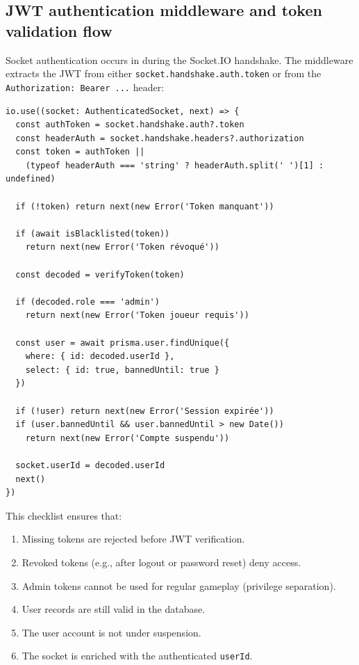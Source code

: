 \documentclass[11pt,a4paper]{article}
\begin{document}
\subsection{JWT authentication middleware and token validation flow}

Socket authentication occurs in  during the Socket.IO handshake. The middleware extracts the JWT from either \texttt{socket.handshake.auth.token} or from the \texttt{Authorization: Bearer ...} header:

\begin{verbatim}
io.use((socket: AuthenticatedSocket, next) => {
  const authToken = socket.handshake.auth?.token
  const headerAuth = socket.handshake.headers?.authorization
  const token = authToken ||
    (typeof headerAuth === 'string' ? headerAuth.split(' ')[1] : undefined)

  if (!token) return next(new Error('Token manquant'))

  if (await isBlacklisted(token))
    return next(new Error('Token révoqué'))

  const decoded = verifyToken(token)

  if (decoded.role === 'admin')
    return next(new Error('Token joueur requis'))

  const user = await prisma.user.findUnique({
    where: { id: decoded.userId },
    select: { id: true, bannedUntil: true }
  })

  if (!user) return next(new Error('Session expirée'))
  if (user.bannedUntil && user.bannedUntil > new Date())
    return next(new Error('Compte suspendu'))

  socket.userId = decoded.userId
  next()
})
\end{verbatim}

\noindent This checklist ensures that:

\begin{enumerate}
\item Missing tokens are rejected before JWT verification.
\item Revoked tokens (e.g., after logout or password reset) deny access.
\item Admin tokens cannot be used for regular gameplay (privilege separation).
\item User records are still valid in the database.
\item The user account is not under suspension.
\item The socket is enriched with the authenticated \texttt{userId}.
\end{enumerate}
\end{document}
